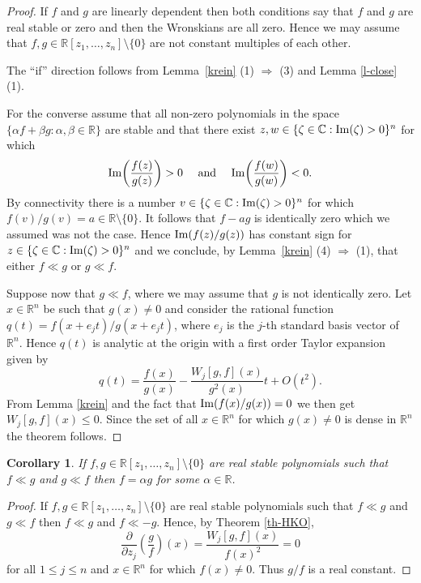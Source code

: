 \documentclass[10pt,reqno]{amsart}
\theoremstyle{plain}
\newtheorem{corollary}[theorem]{Corollary}
\theoremstyle{definition}
\theoremstyle{remark}
\numberwithin{equation}{section}
\newcommand{\RR}{\mathbb{R}}
\newcommand{\CC}{\mathbb{C}}
\renewcommand{\Im}{{\rm Im}}
\begin{document}
\begin{proof}
If $f$ and $g$ are linearly dependent then both conditions say that $f$ and $g$ are real stable or zero and then the Wronskians are all zero. Hence we may assume that $f,g \in \RR[z_1,\ldots, z_n]\setminus \{0\}$ are not constant multiples of each other. 

The ``if'' direction follows from Lemma~\ref{krein} (1) $\Rightarrow$ (3) and Lemma \ref{l-close} (1). 

For the converse assume that all non-zero polynomials in the space 
$
\{\alpha f + \beta g : \alpha, \beta \in \RR\}
$
are stable  and that there exist 
$z,w\in \{\zeta \in \CC: \Im(\zeta)>0\}^n$ for which 
$$
\Im\!\left(\frac{f(z)}{g(z)}\right) > 0 \quad \mbox{ and } \quad  
\Im\!\left(\frac{f(w)}{g(w)}\right) < 0. 
$$
By connectivity there is a number 
$v \in \{\zeta \in \CC: \Im(\zeta)>0\}^n$ for which 
$f(v)/g(v) = a \in \RR \setminus \{0\}$. It follows that $f-ag$ is identically zero which we assumed was not the case. Hence 
$\Im(f(z)/g(z))$ has constant sign for 
$z  \in \{\zeta \in \CC: \Im(\zeta)>0\}^n$ and  we conclude, by 
Lemma~\ref{krein} (4) $\Rightarrow$ (1),  that 
either $f \ll g$ or $g \ll f$. 

Suppose now that $g \ll f$, where we may assume that $g$ is not identically 
zero. Let $x \in \RR^n$ be such that $g(x) \neq 0$ and consider the rational 
function $q(t)= f(x+e_jt)/g(x+e_jt)$, where $e_j$ is the $j$-th standard 
basis vector of $\RR^n$. Hence $q(t)$ is analytic at
 the origin with a first order Taylor expansion given by 
$$
q(t)=\frac{f(x)}{g(x)}- \frac {W_j[g,f](x)}{g^2(x)}t + O(t^2). 
$$
From Lemma \ref{krein} and the fact that $\Im(f(x)/g(x))=0$ 
we then get $W_j[g,f](x) \leq 0$. Since the set of 
all $x \in \RR^n$ for which 
$g(x) \neq 0$ is dense in $\RR^n$ the theorem follows. 
\end{proof}

\begin{corollary}\label{cor-HB}
If $f,g \in \RR[z_1,\ldots, z_n]\setminus \{0\}$ are real stable polynomials
such that $f\ll g$ and $g\ll f$ then $f=\alpha g$ for some $\alpha\in\RR$.
\end{corollary}

\begin{proof}
If $f,g \in \RR[z_1,\ldots, z_n]\setminus \{0\}$ are real stable polynomials
such that $f\ll g$ and $g\ll f$ then $f \ll g$ and $f \ll -g$. Hence, by Theorem \ref{th-HKO}, 
$$
\frac \partial {\partial z_j} \left( \frac g f \right)(x) = \frac {W_j[g,f](x)}{f(x)^2}=0
$$
for all $1\leq j \leq n$ and $x \in \RR^n$ for which $f(x) \neq 0$. Thus $g/f$ is a real constant. 
\end{proof}
\end{document}
